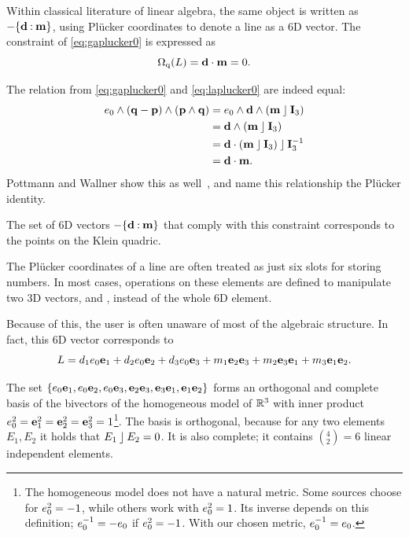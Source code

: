 Within classical literature of linear algebra, the same object is written as $-\{\mathbf{d} \mathbin{:} \mathbf{m}\}$, using Pl\"ucker coordinates to denote a line as a 6D vector.  The constraint of \autoref{eq:gaplucker0} is expressed as 
\begin{equation} \label{eq:laplucker0}
  \operatorname{\Omega_q}(L) = \mathbf{d} \mathbin{\cdot} \mathbf{m} = 0 .
\end{equation}

The relation from \autoref{eq:gaplucker0} and \autoref{eq:laplucker0} are indeed equal:
\begin{align*}
  e_0 \wedge (\mathbf{q} - \mathbf{p}) \wedge (\mathbf{p} \wedge \mathbf{q}) 
  &= e_0 \wedge \mathbf{d} \wedge (\mathbf{m} \mathbin{\rfloor} \mathbf{I}_3) \\
  &= \mathbf{d} \wedge (\mathbf{m} \mathbin{\rfloor} \mathbf{I}_3) \\
  &= \mathbf{d} \mathbin{\cdot} (\mathbf{m} \mathbin{\rfloor} \mathbf{I}_3) \mathbin{\rfloor} \mathbf{I}_3^{-1} \\
  &= \mathbf{d} \mathbin{\cdot} \mathbf{m} .
\end{align*}
Pottmann and Wallner show this as well~\cite[Lemma 2.1.2]{Pottmann}, and name this relationship the Pl\"ucker identity.

The set of 6D vectors $-\{\mathbf{d} \mathbin{:} \mathbf{m}\}$ that comply with this constraint corresponds to the points on the Klein quadric.

The Pl\"ucker coordinates of a line are often treated as just six slots for storing numbers.  In most cases, operations on these elements are defined to manipulate two 3D vectors,  and , instead of the whole 6D element.  

Because of this, the user is often unaware of most of the algebraic structure.  In fact, this 6D vector corresponds to
\begin{equation*}
  L = d_1 e_0\mathbf{e}_1 + d_2 e_0\mathbf{e}_2 + d_3 e_0\mathbf{e}_3 + m_1 \mathbf{e}_2\mathbf{e}_3 + m_2 \mathbf{e}_3\mathbf{e}_1 + m_3 \mathbf{e}_1\mathbf{e}_2 .
\end{equation*}

The set $\{e_0\mathbf{e}_1, e_0\mathbf{e}_2, e_0\mathbf{e}_3, \mathbf{e}_2\mathbf{e}_3, \mathbf{e}_3\mathbf{e}_1, \mathbf{e}_1\mathbf{e}_2\}$ forms an orthogonal and complete basis of the bivectors of the homogeneous model of $\mathbb{R}^3$ with inner product $e_0^2 = \mathbf{e}_1^2 = \mathbf{e}_2^2 = \mathbf{e}_3^2 = 1$\footnote{The homogeneous model does not have a natural metric.  Some sources choose for $e_0^2 = -1$, while others work with $e_0^2 = 1$.  Its inverse depends on this definition; $e_0^{-1} = -e_0$ if $e_0^2 = -1$.  With our chosen metric, $e_0^{-1} = e_0$.}.  The basis is orthogonal, because for any two elements $E_1, E_2$ it holds that $E_1 \mathbin{\rfloor} E_2 = 0$. It is also complete; it contains $(^4_2) = 6$ linear independent elements.

